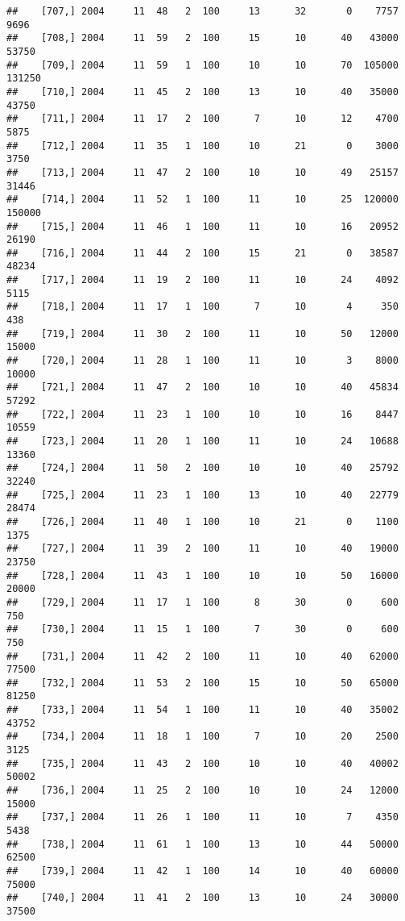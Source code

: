 \documentclass{article}\usepackage[]{graphicx}\usepackage[]{color}
\makeatletter
\newenvironment{kframe}{%
 \def\at@end@of@kframe{}%
 \ifinner\ifhmode%
  \def\at@end@of@kframe{\end{minipage}}%
  \begin{minipage}{\columnwidth}%
 \fi\fi%
 \def\FrameCommand##1{\hskip\@totalleftmargin \hskip-\fboxsep
 \colorbox{shadecolor}{##1}\hskip-\fboxsep
     \hskip-\linewidth \hskip-\@totalleftmargin \hskip\columnwidth}%
 \MakeFramed {\advance\hsize-\width
   \@totalleftmargin\z@ \linewidth\hsize
   \@setminipage}}%
 {\par\unskip\endMakeFramed%
 \at@end@of@kframe}
\newenvironment{knitrout}{}{} %
\makeatother
\begin{document}
\begin{knitrout}
\begin{kframe}
\begin{verbatim}
##    [707,] 2004     11  48   2  100     13      32       0    7757    9696
##    [708,] 2004     11  59   2  100     15      10      40   43000   53750
##    [709,] 2004     11  59   1  100     10      10      70  105000  131250
##    [710,] 2004     11  45   2  100     13      10      40   35000   43750
##    [711,] 2004     11  17   2  100      7      10      12    4700    5875
##    [712,] 2004     11  35   1  100     10      21       0    3000    3750
##    [713,] 2004     11  47   2  100     10      10      49   25157   31446
##    [714,] 2004     11  52   1  100     11      10      25  120000  150000
##    [715,] 2004     11  46   1  100     11      10      16   20952   26190
##    [716,] 2004     11  44   2  100     15      21       0   38587   48234
##    [717,] 2004     11  19   2  100     11      10      24    4092    5115
##    [718,] 2004     11  17   1  100      7      10       4     350     438
##    [719,] 2004     11  30   2  100     11      10      50   12000   15000
##    [720,] 2004     11  28   1  100     11      10       3    8000   10000
##    [721,] 2004     11  47   2  100     10      10      40   45834   57292
##    [722,] 2004     11  23   1  100     10      10      16    8447   10559
##    [723,] 2004     11  20   1  100     11      10      24   10688   13360
##    [724,] 2004     11  50   2  100     10      10      40   25792   32240
##    [725,] 2004     11  23   1  100     13      10      40   22779   28474
##    [726,] 2004     11  40   1  100     10      21       0    1100    1375
##    [727,] 2004     11  39   2  100     11      10      40   19000   23750
##    [728,] 2004     11  43   1  100     10      10      50   16000   20000
##    [729,] 2004     11  17   1  100      8      30       0     600     750
##    [730,] 2004     11  15   1  100      7      30       0     600     750
##    [731,] 2004     11  42   2  100     11      10      40   62000   77500
##    [732,] 2004     11  53   2  100     15      10      50   65000   81250
##    [733,] 2004     11  54   1  100     11      10      40   35002   43752
##    [734,] 2004     11  18   1  100      7      10      20    2500    3125
##    [735,] 2004     11  43   2  100     10      10      40   40002   50002
##    [736,] 2004     11  25   2  100     10      10      24   12000   15000
##    [737,] 2004     11  26   1  100     11      10       7    4350    5438
##    [738,] 2004     11  61   1  100     13      10      44   50000   62500
##    [739,] 2004     11  42   1  100     14      10      40   60000   75000
##    [740,] 2004     11  41   2  100     13      10      24   30000   37500

\end{verbatim}
\end{kframe}
\end{knitrout}
\end{document}
